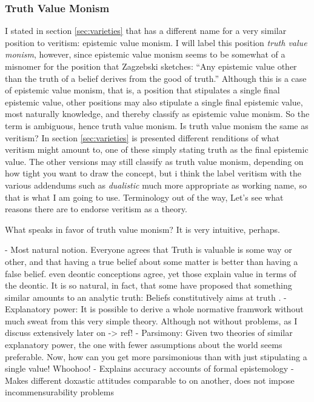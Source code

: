 \documentclass[12pt,numbers=noenddot]{scrartcl}
\begin{document}
\subsubsection{ Truth Value Monism }
I stated in section \ref{sec:varieties} that \textcite[191]{Zagzebski2004-ZAGEVM-2} has a different name for a very similar position to veritism: epistemic value monism. I will label this position \emph{truth value monism}, however, since epistemic value monism seems to be somewhat of a misnomer for the position that Zagzebski sketches: “Any epistemic value other than the truth of a belief derives from the good of truth.” Although this is a case of epistemic value monism, that is, a position that stipulates a single final epistemic value, other positions may also stipulate a single final epistemic value, most naturally knowledge, and thereby classify as epistemic value monism. So the term is ambiguous, hence truth value monism.
Is truth value monism the same as veritism? In section \ref{sec:varieties} is presented different renditions of what veritism might amount to, one of these simply stating truth as the final epistemic value. The other versions may still classify as truth value monism, depending on how tight you want to draw the concept, but i think the label veritism with the various addendums such as \emph{dualistic} much more appropriate as working name, so that is what I am going to use.
Terminology out of the way, Let's see what reasons there are to endorse veritism as a theory.


What speaks in favor of truth value monism? It is very intuitive, perhaps.

- Most natural notion. Everyone agrees that Truth is valuable is some way or other, and that having a true belief about some matter is better than having a false belief. even deontic conceptions agree, yet those explain value in terms of the deontic. It is so natural, in fact, that some have proposed that something similar amounts to an analytic truth: Beliefs constitutively aims at truth \autocite{Shah2003-SHAHTG,Velleman2000-VELOTA}.
- Explanatory power: It is possible to derive a whole normative framwork without much sweat from this very simple theory. Although not without problems, as I discuss extensively later on -> ref!
- Parsimony: Given two theories of similar explanatory power, the one with fewer assumptions about the world seems preferable. Now, how can you get more parsimonious than with just stipulating a single value! Whoohoo!
- Explains accuracy accounts of formal epistemology
- Makes different doxastic attitudes comparable to on another, does not impose incommensurability problems
\end{document}

